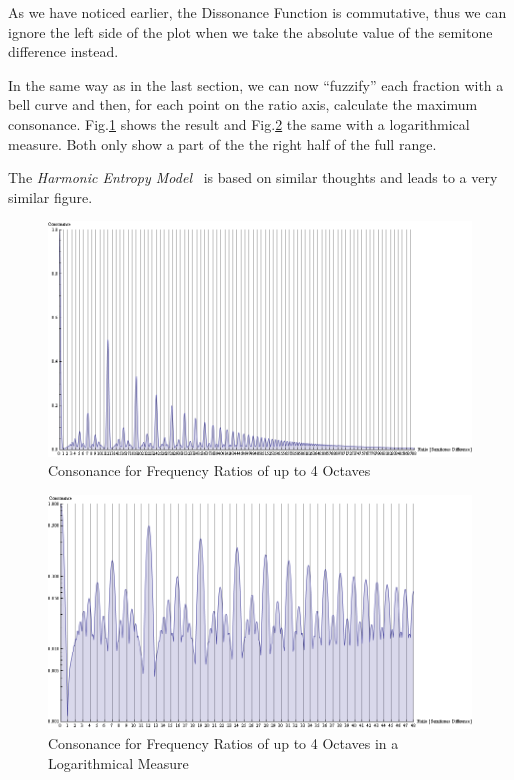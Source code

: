 \documentclass[12pt,a4paper,titlepage,oneside]{report}
\begin{document}
As we have noticed earlier, the Dissonance Function is commutative, thus we can ignore the left side of the plot when we take the absolute value of the semitone difference instead.

In the same way as in the last section, we can now ``fuzzify'' each fraction with a bell curve and then, for each point on the ratio axis, calculate the maximum consonance. Fig.\ref{fig:maxfrac_maxbell} shows the result and Fig.\ref{fig:maxfrac_maxbell_log} the same with a logarithmical measure. Both only show a part of the the right half of the full range.

The \emph{Harmonic Entropy Model}~\cite{bib:harmonic_entropy} is based on similar thoughts and leads to a very similar figure.

\begin{figure}[!ht]
\includegraphics[width=\textwidth]{images/maxfrac_maxbell.png}
\centering
\caption{Consonance for Frequency Ratios of up to 4 Octaves}
\label{fig:maxfrac_maxbell}
\end{figure}

\begin{figure}[!ht]
\includegraphics[width=\textwidth]{images/maxfrac_maxbell_log.png}
\centering
\caption{Consonance for Frequency Ratios of up to 4 Octaves in a Logarithmical Measure}
\label{fig:maxfrac_maxbell_log}
\end{figure}
\end{document}
